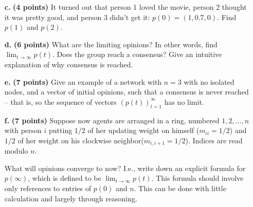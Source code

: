 \documentclass[11pt]{article}
\begin{document}
\begin{itemize}
\item[\textbf{c. }] \textbf{(4 points)} It turned out that person 1 loved the movie, person 2 thought it was pretty good, and person 3 didn't get it: $p(0)=(1,0.7,0)$. Find $p(1)$ and $p(2)$. 
\item[\textbf{d. }] \textbf{(6 points)} What are the limiting opinions? In other words, find $\lim_{t\to\infty}p(t)$. Does the group reach a consensus? Give an intuitive explanation of why consensus is reached. 
\item[\textbf{e. }] \textbf{(7 points)} Give an example of a network with $n=3$ with no isolated nodes, and a vector of initial opinions, such that a consensus is never reached -- that is, so the sequence of vectors $(p(t))_{t=1}^\infty$ has no limit. 
\item[\textbf{f. }] \textbf{(7 points)} Suppose now agents are arranged in a ring, numbered $1,2,\ldots,n$ with person $i$ putting $1/2$ of her updating weight on himself ($m_{ii}=1/2$) and $1/2$ of her weight on his clockwise neighbor($m_{i,i+1}=1/2$). Indices are read modulo $n$.

 What will opinions converge to now? I.e., write down an explicit formula for $p(\infty)$, which is defined to be $\lim_{t \to \infty} p(t)$. This formula should involve only references to entries of $p(0)$ and $n$. This can be done with little calculation and largely through reasoning.
 

 \end{itemize}
\end{document}
